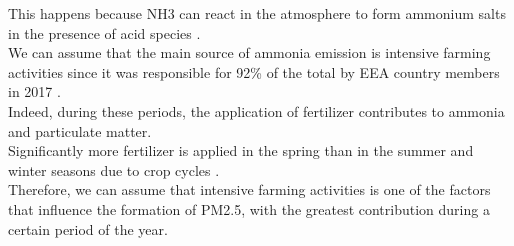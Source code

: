 This happens because NH3 can react in the atmosphere to form ammonium salts in the presence of acid species \cite{viatte2021ammonia}.\\
We can assume that the main source of ammonia emission is intensive farming activities since it was responsible for 92\% of the total by EEA country members in 2017 \cite{maranzano2022air}.\\
Indeed, during these periods, the application of fertilizer contributes to ammonia and particulate matter.\\
Significantly more fertilizer is applied in the spring than in the summer and winter seasons due to crop cycles \cite{goebes2003ammonia}.\\
Therefore, we can assume that intensive farming activities is one of the factors that influence the formation of PM2.5, with the greatest contribution during a certain period of the year.
